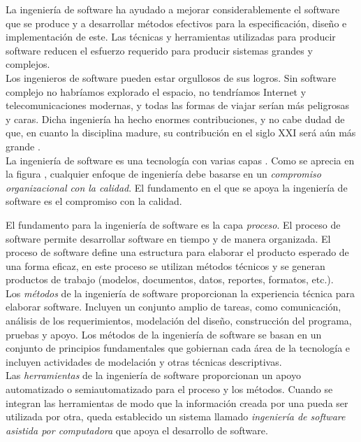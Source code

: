 La ingeniería de software ha ayudado a mejorar considerablemente el software que se produce y a desarrollar métodos efectivos para la especificación, diseño 
e implementación de este. Las técnicas y herramientas utilizadas para producir software reducen el esfuerzo requerido para producir sistemas grandes y complejos.\\

Los ingenieros de software pueden estar orgullosos de sus logros. Sin software complejo
no habríamos explorado el espacio, no tendríamos Internet y telecomunicaciones modernas,
y todas las formas de viajar serían más peligrosas y caras. Dicha ingeniería ha hecho enormes
contribuciones, y no cabe dudad de que, en cuanto la disciplina madure, su contribución en el
siglo XXI será aún más grande \cite{sommerville1992software}.\\

La ingeniería de software es una tecnología con varias capas \cite{pressman2005software}. Como se aprecia en la figura
, cualquier enfoque de ingeniería debe basarse en un \emph{compromiso
organizacional con la calidad}. El fundamento en el que se apoya la ingeniería de software es el compromiso con la calidad.\\


El fundamento para la ingeniería de software es la capa \emph{proceso}. El proceso de software permite desarrollar software en tiempo y de manera organizada.
El proceso de software define una estructura para elaborar el producto esperado de una forma eficaz, en este proceso
se utilizan métodos técnicos y se generan productos de trabajo (modelos, documentos, datos,
reportes, formatos, etc.).\\

Los \emph{métodos} de la ingeniería de software proporcionan la experiencia técnica para elaborar
software. Incluyen un conjunto amplio de tareas, como comunicación, análisis de los requerimientos, 
modelación del diseño, construcción del programa, pruebas y apoyo. Los métodos de
la ingeniería de software se basan en un conjunto de principios fundamentales que gobiernan
cada área de la tecnología e incluyen actividades de modelación y otras técnicas descriptivas. \\

Las \emph{herramientas} de la ingeniería de software proporcionan un apoyo automatizado o semiautomatizado 
para el proceso y los métodos. Cuando se integran las herramientas de modo
que la información creada por una pueda ser utilizada por otra, queda establecido un sistema
llamado \emph{ingeniería de software asistida por computadora} que apoya el desarrollo de software.\\

